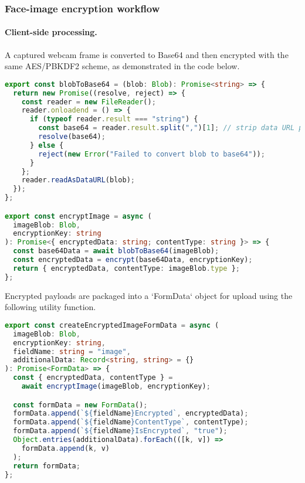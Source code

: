 \clearpage
\subsubsection{Face-image encryption workflow}

\paragraph{Client-side processing.}
A captured webcam frame is converted to Base64 and then encrypted with the same AES/PBKDF2 scheme, as demonstrated in the code below.

\begin{lstlisting}[language=TypeScript, caption={Client-side webcam image processing and encryption}, label={lst:image-processing}]
export const blobToBase64 = (blob: Blob): Promise<string> => {
  return new Promise((resolve, reject) => {
    const reader = new FileReader();
    reader.onloadend = () => {
      if (typeof reader.result === "string") {
        const base64 = reader.result.split(",")[1]; // strip data URL prefix
        resolve(base64);
      } else {
        reject(new Error("Failed to convert blob to base64"));
      }
    };
    reader.readAsDataURL(blob);
  });
};

export const encryptImage = async (
  imageBlob: Blob,
  encryptionKey: string
): Promise<{ encryptedData: string; contentType: string }> => {
  const base64Data = await blobToBase64(imageBlob);
  const encryptedData = encrypt(base64Data, encryptionKey);
  return { encryptedData, contentType: imageBlob.type };
};
\end{lstlisting}

\clearpage
Encrypted payloads are packaged into a `FormData` object for upload using the following utility function.

\begin{lstlisting}[language=TypeScript, caption={Creation of FormData for encrypted image upload}, label={lst:form-data}]
export const createEncryptedImageFormData = async (
  imageBlob: Blob,
  encryptionKey: string,
  fieldName: string = "image",
  additionalData: Record<string, string> = {}
): Promise<FormData> => {
  const { encryptedData, contentType } =
    await encryptImage(imageBlob, encryptionKey);

  const formData = new FormData();
  formData.append(`${fieldName}Encrypted`, encryptedData);
  formData.append(`${fieldName}ContentType`, contentType);
  formData.append(`${fieldName}IsEncrypted`, "true");
  Object.entries(additionalData).forEach(([k, v]) =>
    formData.append(k, v)
  );
  return formData;
};
\end{lstlisting}

